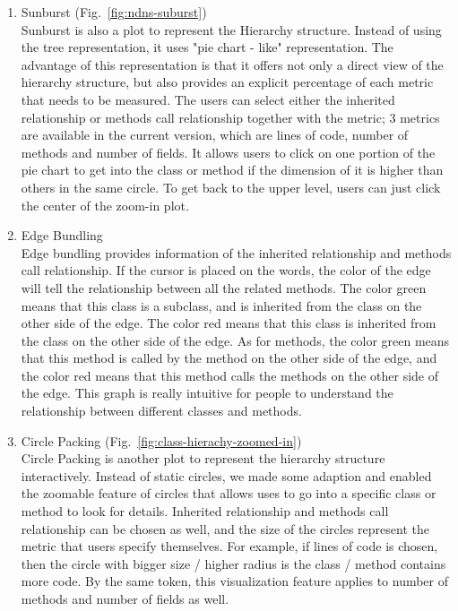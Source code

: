 \documentclass{sig-alternate}
\begin{document}
\begin{enumerate}
\vspace{-6pt}
\item Sunburst (Fig.~\ref{fig:ndns-suburst})\\
Sunburst is also a plot to represent the Hierarchy structure. Instead of using the tree representation, it uses "pie chart - like" representation. The advantage of this representation is that it offers not only a direct view of the hierarchy structure, but also provides an explicit percentage of each metric that needs to be measured. The users can select either the inherited relationship or methods call relationship together with the metric; 3 metrics are available in the current version, which are lines of code, number of methods and number of fields. It allows users to click on one portion of the pie chart to get into the class or method if the dimension of it is higher than others in the same circle. To get back to the upper level, users can just click the center of the zoom-in plot.
\vspace{-6pt}
\item Edge Bundling \\
Edge bundling provides information of the inherited relationship and methods call relationship. If the cursor is placed on the words, the color of the edge will tell the relationship between all the related methods. The color green means that this class is a subclass, and is inherited from the class on the other side of the edge. The color red means that this class is inherited from the class on the other side of the edge. As for methods, the color green means that this method is called by the method on the other side of the edge, and the color red means that this method calls the methods on the other side of the edge. This graph is really intuitive for people to understand the relationship between different classes and methods.
\vspace{-6pt}
\item Circle Packing (Fig.~\ref{fig:class-hierachy-zoomed-in}) \\
Circle Packing is another plot to represent the hierarchy structure interactively. Instead of static circles, we made some adaption and enabled the zoomable feature of circles that allows uses to go into a specific class or method to look for details. Inherited relationship and methods call relationship can be chosen as well, and the size of the circles represent the metric that users specify themselves. For example, if lines of code is chosen, then the circle with bigger size / higher radius is the class / method contains more code. By the same token, this visualization feature applies to number of methods and number of fields as well.

\end{enumerate}
\end{document}
